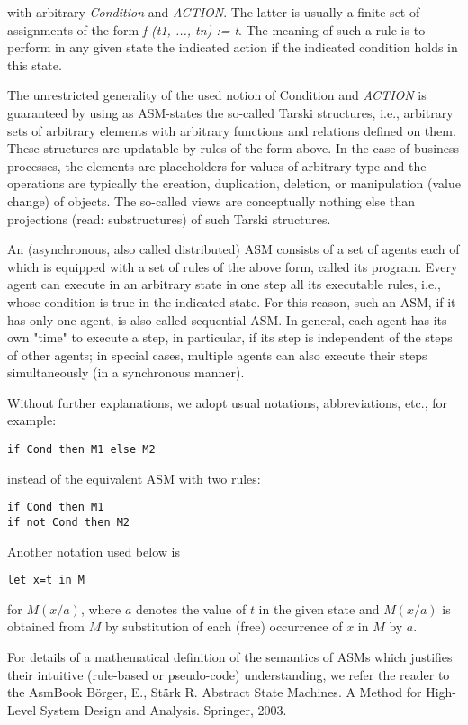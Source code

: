 with arbitrary \textit{Condition} and \textit{ACTION}. The latter is usually a finite set of assignments of the form \textit{f (t1, ..., tn) := t}. The meaning of such a rule is to perform in any given state the indicated action if the indicated condition holds in this state.

The unrestricted generality of the used notion of Condition and \textit{ACTION} is guaranteed by using as ASM-states the so-called Tarski structures, i.e., arbitrary sets of arbitrary elements with arbitrary functions and relations defined on them. These structures are updatable by rules of the form above. In the case of business processes, the elements are placeholders for values of arbitrary type and the operations are typically the creation, duplication, deletion, or manipulation (value change) of objects. The so-called views are conceptually nothing else than projections (read: substructures) of such Tarski structures.

An (asynchronous, also called distributed) ASM consists of a set of agents each of which is equipped with a set of rules of the above form, called its program. Every agent can execute in an arbitrary state in one step all its executable rules, i.e., whose condition is true in the indicated state. For this reason, such an ASM, if it has only one agent, is also called sequential ASM. In general, each agent has its own "time" to execute a step, in particular, if its step is independent of the steps of other agents;  in special cases, multiple agents can also execute their steps simultaneously (in a synchronous manner).

Without further explanations, we adopt usual notations, abbreviations, etc., for example:



\begin{lstlisting}
if Cond then M1 else M2
\end{lstlisting}

instead of the equivalent ASM with two rules:

\begin{lstlisting}
if Cond then M1
if not Cond then M2
\end{lstlisting}

Another notation used below is

\begin{lstlisting}
let x=t in M
\end{lstlisting}

for $M(x/a)$, where $a$ denotes the value of $t$ in the given state and $M(x/a)$ is obtained from $M$ by substitution of each (free) occurrence of $x$ in $M$ by $a$.

For details of a mathematical definition of the semantics of ASMs which justifies their intuitive (rule-based or pseudo-code) understanding, we refer the reader to the AsmBook Börger, E., Stärk R. Abstract State Machines. A Method for High-Level System Design and Analysis. Springer, 2003.





